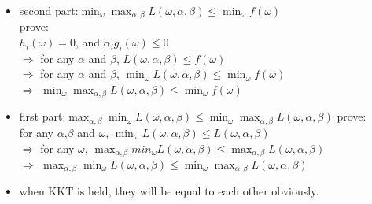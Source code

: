 \begin{frame}
	\small
	\begin{itemize}
		\item second part:$\min_{\omega}\max_{\alpha,\beta}L(\omega,\alpha,\beta)
				\leq
				\min_\omega f(\omega)$\\
			prove:\\
			$h_i(\omega)=0$, and $\alpha_ig_i(\omega)\leq 0$\\
			$\Rightarrow$
			for any $\alpha$ and $\beta$, $L(\omega,\alpha,\beta) \leq  f(\omega)$
			\\$\Rightarrow$
			for any $\alpha$ and $\beta$, $\min_{\omega}L(\omega,\alpha,\beta) \leq  \min_{\omega}f(\omega)$
			\\$\Rightarrow$
			$\min_{\omega}\max_{\alpha,\beta}L(\omega,\alpha,\beta) \leq  \min_{\omega}f(\omega)$
		\item first part:$\max_{\alpha,\beta}\min_{\omega}L(\omega,\alpha,\beta)
				\leq
				\min_{\omega}\max_{\alpha,\beta}L(\omega,\alpha,\beta)$
			prove:\\
				for any $\alpha$,$\beta$ and $\omega$, $\min_{\omega}L(\omega,\alpha,\beta)
					 \leq L(\omega,\alpha,\beta)$
				\\$\Rightarrow$
					for any $\omega$, $\max_{\alpha,\beta}min_{\omega}L(\omega,\alpha,\beta) 
					\leq \max_{\alpha,\beta}L(\omega,\alpha,\beta)$
				\\$\Rightarrow$
					$\max_{\alpha,\beta}\min_{\omega}L(\omega,\alpha,\beta) 
					\leq \min_{\omega}\max_{\alpha,\beta}L(\omega,\alpha,\beta)$
		\item
			when KKT is held, they will be equal to each other obviously.
	\end{itemize}
\end{frame}
\ifx\allfiles\undefined

\fi
